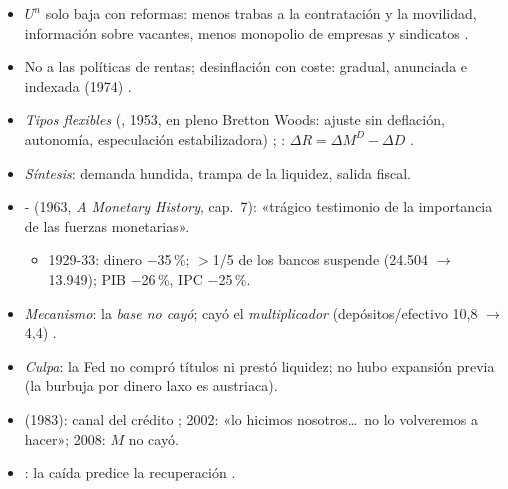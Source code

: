 \documentclass{article}
\begin{document}
\begin{columnas}
\begin{itemize}
\item $U^n$ solo baja con reformas: menos trabas a la contratación y la movilidad, información sobre vacantes, menos monopolio de empresas y sindicatos .
\item No a las políticas de rentas; desinflación con coste: gradual, anunciada e indexada (1974) .
\item \emph{Tipos flexibles} (, 1953, en pleno Bretton Woods: ajuste sin deflación, autonomía, especulación estabilizadora) ; : $\Delta R=\Delta M^D-\Delta D$ .
\end{itemize}
\begin{itemize}
\item \emph{Síntesis}: demanda hundida, trampa de la liquidez, salida fiscal.
\item {}- (1963, \emph{A Monetary History}, cap.~7): «trágico testimonio de la importancia de las fuerzas monetarias».
  \begin{itemize}
  \item 1929-33: dinero $-$35\,\%; $>$1/5 de los bancos suspende (24.504 $\to$ 13.949); PIB $-$26\,\%, IPC $-$25\,\%.
  \end{itemize}
\item \emph{Mecanismo}: la \emph{base no cayó}; cayó el \emph{multiplicador} (depósitos/efectivo 10,8 $\to$ 4,4) .
\end{itemize}
\begin{itemize}
\item \emph{Culpa}: la Fed no compró títulos ni prestó liquidez; no hubo expansión previa (la burbuja por dinero laxo es austriaca).
\item {} (1983): canal del crédito ; 2002: «lo hicimos nosotros\ldots\ no lo volveremos a hacer»; 2008: $M$ no cayó.
\item {}: la caída predice la recuperación .
\end{itemize}


\end{columnas}
\end{document}
